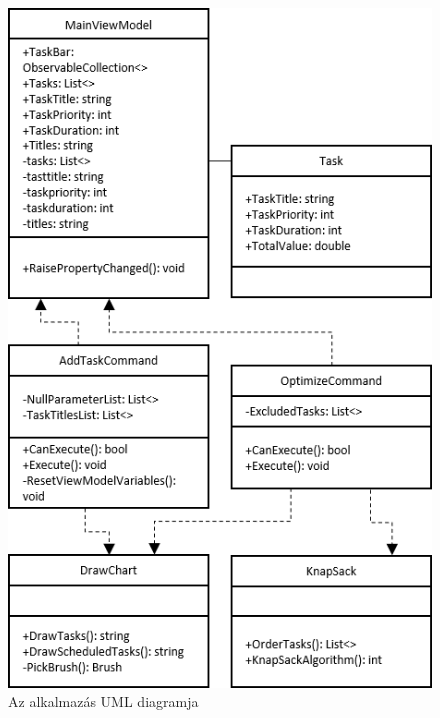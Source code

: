 \begin{figure}[h]
	\centering
	\includegraphics[scale=1]{images/uml.png}
	\caption{Az alkalmazás UML diagramja}
\end{figure}

